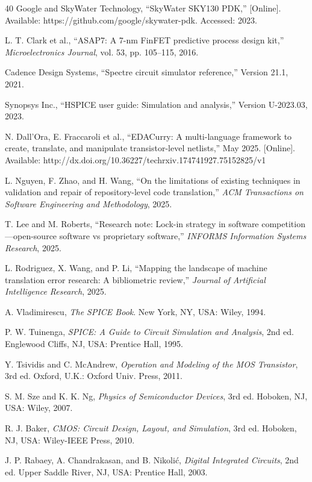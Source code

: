 \documentclass[10pt,twocolumn]{article}
\begin{document}
\begin{thebibliography}{40}
 Google and SkyWater Technology, ``SkyWater SKY130 PDK,'' [Online]. Available: https://github.com/google/skywater-pdk. Accessed: 2023.

 L. T. Clark et al., ``ASAP7: A 7-nm FinFET predictive process design kit,'' \textit{Microelectronics Journal}, vol. 53, pp. 105--115, 2016.

 Cadence Design Systems, ``Spectre circuit simulator reference,'' Version 21.1, 2021.

 Synopsys Inc., ``HSPICE user guide: Simulation and analysis,'' Version U-2023.03, 2023.

 N. Dall'Ora, E. Fraccaroli et al., ``EDACurry: A multi-language framework to create, translate, and manipulate transistor-level netlists,'' May 2025. [Online]. Available: http://dx.doi.org/10.36227/techrxiv.174741927.75152825/v1

 L. Nguyen, F. Zhao, and H. Wang, ``On the limitations of existing techniques in validation and repair of repository-level code translation,'' \textit{ACM Transactions on Software Engineering and Methodology}, 2025.

 T. Lee and M. Roberts, ``Research note: Lock-in strategy in software competition---open-source software vs proprietary software,'' \textit{INFORMS Information Systems Research}, 2025.

 L. Rodriguez, X. Wang, and P. Li, ``Mapping the landscape of machine translation error research: A bibliometric review,'' \textit{Journal of Artificial Intelligence Research}, 2025.

 A. Vladimirescu, \textit{The SPICE Book}. New York, NY, USA: Wiley, 1994.

 P. W. Tuinenga, \textit{SPICE: A Guide to Circuit Simulation and Analysis}, 2nd ed. Englewood Cliffs, NJ, USA: Prentice Hall, 1995.

 Y. Tsividis and C. McAndrew, \textit{Operation and Modeling of the MOS Transistor}, 3rd ed. Oxford, U.K.: Oxford Univ. Press, 2011.

 S. M. Sze and K. K. Ng, \textit{Physics of Semiconductor Devices}, 3rd ed. Hoboken, NJ, USA: Wiley, 2007.

 R. J. Baker, \textit{CMOS: Circuit Design, Layout, and Simulation}, 3rd ed. Hoboken, NJ, USA: Wiley-IEEE Press, 2010.

 J. P. Rabaey, A. Chandrakasan, and B. Nikoli\'c, \textit{Digital Integrated Circuits}, 2nd ed. Upper Saddle River, NJ, USA: Prentice Hall, 2003.


\end{thebibliography}
\end{document}
